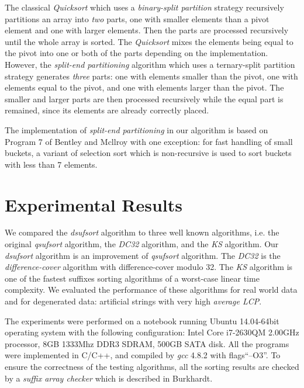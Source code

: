 \documentclass{ws-ijprai}
\begin{document}
The classical \emph{Quicksort} which uses a \emph{binary-split
partition} strategy recursively partitions an array into \emph{two}
parts, one with smaller elements than a pivot element and one with
larger elements. Then the parts are processed recursively until the
whole array is sorted. The \emph{Quicksort} mixes the elements being
equal to the pivot into one or both of the parts depending on the
implementation. However, the \emph{split-end partitioning} algorithm
which uses a ternary-split partition strategy generates \emph{three}
parts: one with elements smaller than the pivot, one with elements
equal to the pivot, and one with elements larger than the pivot. The
smaller and larger parts are then processed recursively while the
equal part is remained, since its elements are already correctly
placed.

The implementation of \emph{split-end partitioning} in our algorithm
is based on Program 7 of Bentley and Mcllroy \cite{t_quciksort} with
one exception: for fast handling of small buckets, a variant of
selection sort which is non-recursive is used to sort buckets with
less than 7 elements.


\section{Experimental Results}

We compared the \emph{dsufsort} algorithm to three well known
algorithms, i.e. the original \emph{qsufsort}
algorithm\cite{qsufsort}, the \emph{DC32}\cite{DC32} algorithm, and
the \emph{KS} algorithm\cite{KS}.  Our \emph{dsufsort} algorithm is an
improvement of \emph{qsufsort} algorithm. The \emph{DC32} is the
\emph{difference-cover} algorithm with difference-cover modulo 32.
The \emph{KS} algorithm is one of the fastest suffixes sorting
algorithms of a worst-case linear time complexity. We evaluated the
performance of these algorithms for real world data and for
degenerated data: artificial strings with very high \emph{average
LCP}.

The experiments were performed on a notebook running Ubuntu
14.04-64bit operating system with the following configuration: Intel
Core i7-2630QM 2.00GHz processor, 8GB 1333Mhz DDR3 SDRAM, 500GB SATA
disk. All the programs were implemented in C/C++, and compiled by
\emph{gcc} 4.8.2 with flags``--O3''. To ensure the correctness of the
testing algorithms, all the sorting results are checked by a
\emph{suffix array checker} which is described in
Burkhardt\cite{DC32}.
\end{document}

